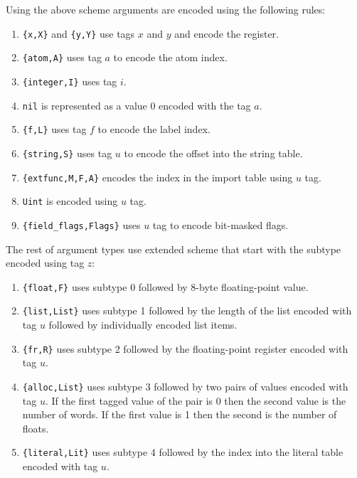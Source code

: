 \documentclass{article}
\begin{document}
Using the above scheme arguments are encoded using the following rules$:$

\begin{enumerate}
\item \verb${x,X}$ and \verb${y,Y}$ use tags $x$ and $y$ and encode the register.
\item \verb${atom,A}$ uses tag $a$ to encode the atom index.
\item \verb${integer,I}$ uses tag $i$.
\item \verb$nil$ is represented as a value 0 encoded with the tag $a$.
\item \verb${f,L}$ uses tag $f$ to encode the label index.
\item \verb${string,S}$ uses tag $u$ to encode the offset into the string table.
\item \verb${extfunc,M,F,A}$ encodes the index in the import table using $u$ tag.
\item \verb$Uint$ is encoded using $u$ tag.
\item \verb${field_flags,Flags}$ uses $u$ tag to encode bit-masked flags.
\end{enumerate}

The rest of argument types use extended scheme that start with the subtype
encoded using tag $z$$:$

\begin{enumerate}
\item \verb${float,F}$ uses subtype 0 followed by 8-byte floating-point value.
\item \verb${list,List}$ uses subtype 1 followed by the length of the list encoded
with tag $u$ followed by individually encoded list items.
\item \verb${fr,R}$ uses subtype 2 followed by the floating-point register encoded
with tag $u$.
\item \verb${alloc,List}$ uses subtype 3 followed by two pairs of values encoded with
tag $u$. If the first tagged value of the pair is 0 then the second value is
the number of words. If the first value is 1 then the second is the number of
floats.
\item \verb${literal,Lit}$ uses subtype 4 followed by the index into the literal table
encoded with tag $u$.
\end{enumerate}
\end{document}
